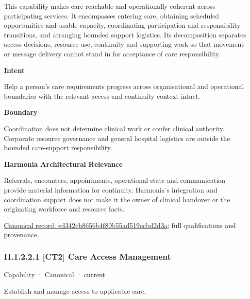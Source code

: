 This capability makes care reachable and operationally coherent across participating services. It encompasses entering care, obtaining scheduled opportunities and usable capacity, coordinating participation and responsibility transitions, and arranging bounded support logistics. Its decomposition separates access decisions, resource use, continuity and supporting work so that movement or message delivery cannot stand in for acceptance of care responsibility.



\textbf{Intent}



Help a person's care requirements progress across organisational and operational boundaries with the relevant access and continuity context intact.



\textbf{Boundary}



Coordination does not determine clinical work or confer clinical authority. Corporate resource governance and general hospital logistics are outside the bounded care-support responsibility.



\textbf{Harmonia Architectural Relevance}



Referrals, encounters, appointments, operational state and communication provide material information for continuity. Harmonia's integration and coordination support does not make it the owner of clinical handover or the originating workforce and resource facts.


{\footnotesize \href{../../../../continuum/strategy/capability/ed342cb8656b4f80b55ad519ecbd2d3a.md}{Canonical record: ed342cb8656b4f80b55ad519ecbd2d3a}; full qualifications and provenance.}\par
\subsubsection*{II.1.2.2.1 [CT2] Care Access Management}
\label{navigation:II.1.2.2.1}

\label{element:acbcad8330e64b59be5e3ec4a100a544}
{\small Capability · Canonical · current}\par

Establish and manage access to applicable care.



